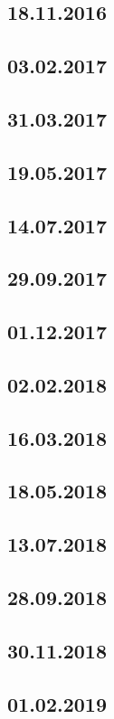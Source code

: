 \documentclass[a4paper,12p]{article}
\begin{document}
	\subsection{18.11.2016}
	\subsection{03.02.2017}
	\subsection{31.03.2017}
	\subsection{19.05.2017}
	\subsection{14.07.2017}
	\subsection{29.09.2017}
	\subsection{01.12.2017}
	\subsection{02.02.2018}
	\subsection{16.03.2018}
	\subsection{18.05.2018}
	\subsection{13.07.2018}
	\subsection{28.09.2018}
	\subsection{30.11.2018}
	\subsection{01.02.2019}
	\newpage
\end{document}
